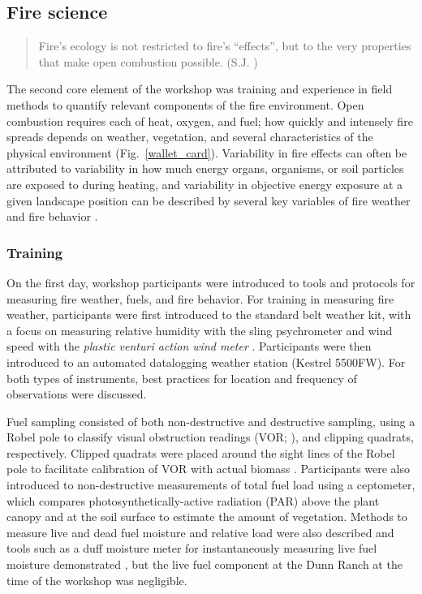 \documentclass[fire,article,submit,moreauthors,pdftex]{Definitions/mdpi}
\begin{document}
\subsection{Fire science}

\begin{quote}
Fire's ecology is not restricted to fire's ``effects'', but to the very properties that make open combustion possible. (S.J. \citet[][p.~126]{pyne2004})
\end{quote}

The second core element of the workshop was training and experience in field methods to quantify relevant components of the fire environment.
Open combustion requires each of heat, oxygen, and fuel; how quickly and intensely fire spreads depends on weather, vegetation, and several characteristics of the physical environment (Fig.~\ref{wallet_card}).
Variability in fire effects can often be attributed to variability in how much energy organs, organisms, or soil particles are exposed to during heating, and variability in objective energy exposure at a given landscape position can be described by several key variables of fire weather and fire behavior \citep{mcgranahan2021}.

\subsubsection{Training}

On the first day, workshop participants were introduced to tools and protocols for measuring fire weather, fuels, and fire behavior.
For training in measuring fire weather, participants were first introduced to the standard belt weather kit, with a focus on measuring relative humidity with the sling psychrometer and wind speed with the \emph{plastic venturi action wind meter} \citep{BeltWxKit}.
Participants were then introduced to an automated datalogging weather station (Kestrel 5500FW).
For both types of instruments, best practices for location and frequency of observations were discussed.

Fuel sampling consisted of both non-destructive and destructive sampling, using a Robel pole to classify visual obstruction readings (VOR; \citep{robel1970}), and clipping quadrats, respectively.
Clipped quadrats were placed around the sight lines of the Robel pole to facilitate calibration of VOR with actual biomass \citep{vermeire2002}.
Participants were also introduced to non-destructive measurements of total fuel load using a ceptometer, which compares photosynthetically-active radiation (PAR) above the plant canopy and at the soil surface to estimate the amount of vegetation.
Methods to measure live and dead fuel moisture and relative load were also described and tools such as a duff moisture meter for instantaneously measuring live fuel moisture demonstrated \citep{mcgranahan2019}, but the live fuel component at the Dunn Ranch at the time of the workshop was negligible.
\end{document}
